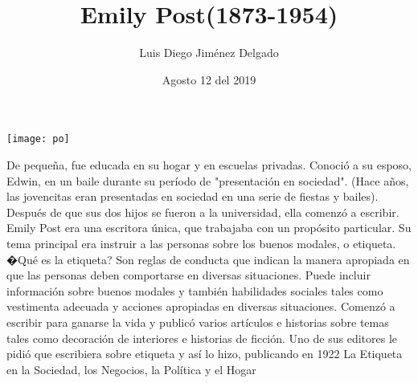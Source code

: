 \documentclass[12pt]{article}
\title{Emily Post(1873-1954)}
\author{Luis Diego Jiménez Delgado}
\date{Agosto 12 del 2019}
\begin{document}
\maketitle

\begin{center}
\texttt{[image: po]}
\end{center}
De pequeña, fue educada en su hogar y en escuelas privadas. Conoció a su esposo, Edwin, en un baile durante su período de "presentación en sociedad". (Hace años, las jovencitas eran presentadas en sociedad en una serie de fiestas y bailes). Después de que sus dos hijos se fueron a la universidad, ella comenzó a escribir.
Emily Post era una escritora única, que trabajaba con un propósito particular. Su tema principal era instruir a las personas sobre los buenos modales, o etiqueta. �Qué es la etiqueta? Son reglas de conducta que indican la manera apropiada en que las personas deben comportarse en diversas situaciones. Puede incluir información sobre buenos modales y también habilidades sociales tales como vestimenta adecuada y acciones apropiadas en diversas situaciones.
Comenzó a escribir para ganarse la vida y publicó varios artículos e historias sobre temas tales como decoración de interiores e historias de ficción. Uno de sus editores le pidió que escribiera sobre etiqueta y así lo hizo, publicando en 1922 La Etiqueta en la Sociedad, los Negocios, la Política y el Hogar
\end{document}
